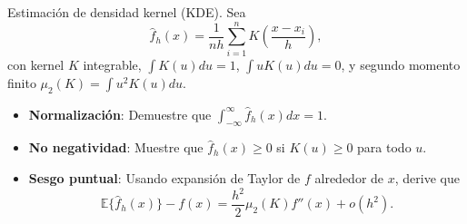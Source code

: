 \documentclass[a4paper,11pt]{article}
\begin{document}
\newpage
\begin{ejercicio}{13}
Estimación de densidad kernel (KDE). Sea
\[
\hat{f}_{h}(x) = \frac{1}{nh} \sum_{i=1}^{n} K\left(\frac{x-x_i}{h}\right),
\]
con kernel $K$ integrable, $\int K(u) du = 1$, $\int uK(u) du = 0$, y segundo momento finito $\mu_2(K) = \int u^2 K(u) du$.

\begin{itemize}
    \item \textbf{Normalización}: Demuestre que $\int_{-\infty}^{\infty} \hat{f}_{h}(x) dx = 1$.
    \item \textbf{No negatividad}: Muestre que $\hat{f}_{h}(x) \geq 0$ si $K(u) \geq 0$ para todo $u$.
    \item \textbf{Sesgo puntual}: Usando expansión de Taylor de $f$ alrededor de $x$, derive que
    \[
    \mathbb{E}\{\hat{f}_{h}(x)\} - f(x) = \frac{h^2}{2} \mu_2(K) f''(x) + o(h^2).
    \]
\end{itemize}
\end{ejercicio}
\end{document}
